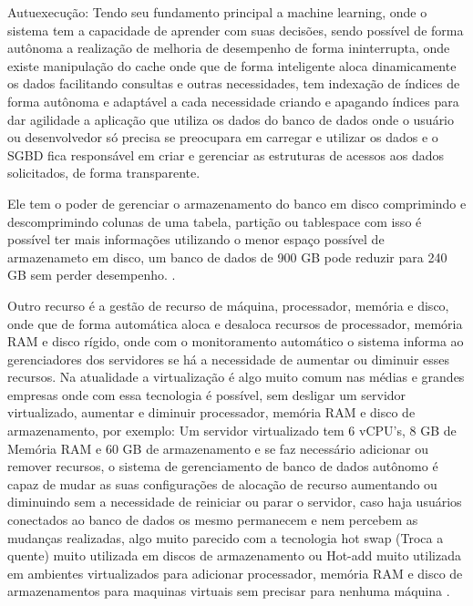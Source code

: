 \begin{alineas}
	\item Autuexecução: Tendo seu fundamento principal a machine learning, onde o sistema tem a capacidade de aprender com suas decisões, sendo possível de forma autônoma a realização de melhoria de desempenho de forma ininterrupta, onde existe manipulação do cache onde que de forma inteligente aloca dinamicamente os dados facilitando consultas e outras necessidades, tem indexação de índices de forma autônoma e adaptável a cada necessidade criando e apagando índices para dar agilidade a aplicação que utiliza os dados do banco de dados onde o usuário ou desenvolvedor só precisa se preocupara em carregar e utilizar os dados e o SGBD fica responsável em criar e gerenciar as estruturas de acessos aos dados solicitados, de forma transparente.
	
	 Ele tem o poder de gerenciar o armazenamento do banco em disco comprimindo e descomprimindo colunas de uma tabela, partição ou tablespace com isso é possível ter mais informações utilizando o menor espaço possível de armazenameto em disco, um banco de dados de 900 GB pode reduzir para 240 GB sem perder desempenho. \cite{OracleExadata}.
	 
	 Outro recurso é a gestão de recurso de máquina, processador, memória e disco, onde que de forma automática aloca e desaloca recursos de processador, memória RAM e disco rígido, onde com o monitoramento automático o sistema informa ao gerenciadores dos servidores se há a necessidade de aumentar ou diminuir esses recursos. Na atualidade a virtualização é algo muito comum nas médias e grandes empresas onde com essa tecnologia é possível, sem desligar um servidor virtualizado, aumentar e diminuir processador, memória RAM e disco de armazenamento, por exemplo: Um servidor virtualizado tem 6 vCPU’s, 8 GB de Memória RAM e 60 GB de armazenamento e se faz necessário adicionar ou remover recursos, o sistema de gerenciamento de banco de dados autônomo é capaz de mudar as suas configurações de alocação de recurso aumentando ou diminuindo sem a necessidade de reiniciar ou parar o servidor, caso haja usuários conectados ao banco de dados os mesmo permanecem e nem percebem as mudanças realizadas, algo muito parecido com a tecnologia hot swap (Troca a quente) muito utilizada em discos de armazenamento ou Hot-add muito utilizada em ambientes virtualizados para adicionar processador, memória RAM e disco de armazenamentos para maquinas virtuais sem precisar para nenhuma máquina \cite{OracleBreakingFree}.
	

\end{alineas}
